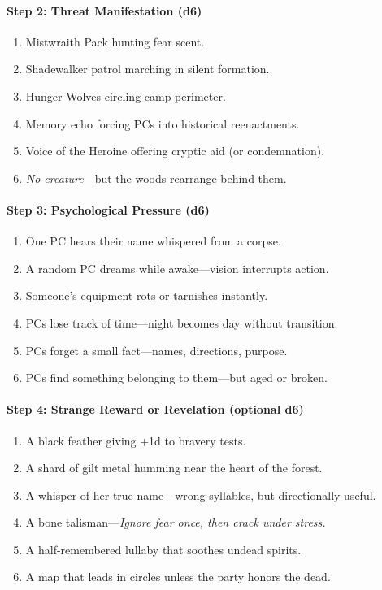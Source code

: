 \documentclass[11pt]{article}
\begin{document}
\paragraph{Step 2: Threat Manifestation (d6)}
\begin{enumerate}
  \item Mistwraith Pack hunting fear scent.
  \item Shadewalker patrol marching in silent formation.
  \item Hunger Wolves circling camp perimeter.
  \item Memory echo forcing PCs into historical reenactments.
  \item Voice of the Heroine offering cryptic aid (or condemnation).
  \item \emph{No creature}---but the woods rearrange behind them.
\end{enumerate}

\paragraph{Step 3: Psychological Pressure (d6)}
\begin{enumerate}
  \item One PC hears their name whispered from a corpse.
  \item A random PC dreams while awake---vision interrupts action.
  \item Someone's equipment rots or tarnishes instantly.
  \item PCs lose track of time---night becomes day without transition.
  \item PCs forget a small fact---names, directions, purpose.
  \item PCs find something belonging to them---but aged or broken.
\end{enumerate}

\paragraph{Step 4: Strange Reward or Revelation (optional d6)}
\begin{enumerate}
  \item A black feather giving +1d to bravery tests.
  \item A shard of gilt metal humming near the heart of the forest.
  \item A whisper of her true name---wrong syllables, but directionally useful.
  \item A bone talisman---\emph{Ignore fear once, then crack under stress.}
  \item A half-remembered lullaby that soothes undead spirits.
  \item A map that leads in circles unless the party honors the dead.
\end{enumerate}
\end{document}
